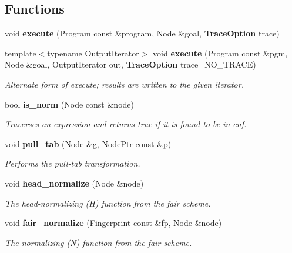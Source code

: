 \subsection*{Functions}
\begin{CompactItemize}
\item 
void {\bf execute} (Program const \&program, Node \&goal, {\bf Trace\-Option} trace)\label{namespacesprite_a51}

\item 
template$<$typename Output\-Iterator$>$ void {\bf execute} (Program const \&pgm, Node \&goal, Output\-Iterator out, {\bf Trace\-Option} trace=NO\_\-TRACE)\label{namespacesprite_a52}

\begin{CompactList}\small\item\em Alternate form of execute; results are written to the given iterator. \item\end{CompactList}\item 
bool {\bf is\_\-norm} (Node const \&node)\label{namespacesprite_a53}

\begin{CompactList}\small\item\em Traverses an expression and returns true if it is found to be in cnf. \item\end{CompactList}\item 
void {\bf pull\_\-tab} (Node \&g, Node\-Ptr const \&p)
\begin{CompactList}\small\item\em Performs the pull-tab transformation. \item\end{CompactList}\item 
void {\bf head\_\-normalize} (Node \&node)
\begin{CompactList}\small\item\em The head-normalizing (H) function from the fair scheme. \item\end{CompactList}\item 
void {\bf fair\_\-normalize} (Fingerprint const \&fp, Node \&node)\label{namespacesprite_a56}

\begin{CompactList}\small\item\em The normalizing (N) function from the fair scheme. \item\end{CompactList}\end{CompactItemize}


